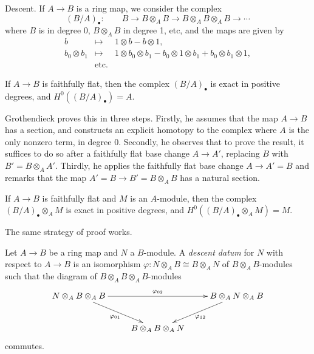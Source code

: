 \medskip\noindent
Descent. If $A \to B$ is a ring map, we consider the complex
$$
(B/A)_\bullet : \qquad B \to B\otimes_A B \to B\otimes_A B \otimes_A B \to
\cdots
$$
where $B$ is in degree 0, $B\otimes_A B$ in degree 1, etc, and the maps are
given by
\begin{eqnarray*}
b & \mapsto & 1 \otimes b - b \otimes 1, \\
b_0 \otimes b_1 & \mapsto & 1 \otimes b_0 \otimes b_1 - b_0 \otimes 1 \otimes
b_1 + b_0 \otimes b_1 \otimes 1, \\
& \text{etc.}
\end{eqnarray*}

\begin{lemma}
\label{lemma-algebra-descent}
If $A \to B$ is faithfully flat, then the complex $(B/A)_\bullet$ is exact in
positive degrees, and $H^0((B/A)_\bullet) = A$.
\end{lemma}

\noindent
Grothendieck proves this in three steps. Firstly, he assumes that the map $A
\to B$ has a section, and constructs an explicit homotopy to the complex where
$A$ is the only nonzero term, in degree 0. Secondly, he observes that to prove
the result, it suffices to do so after a faithfully flat base change $A \to
A'$, replacing $B$ with $B' = B \otimes_A A'$. Thirdly, he applies the
faithfully flat base change $A \to A' =B$ and remarks that the map $A' = B \to
B' = B\otimes_A B$ has a natural section.

\begin{lemma}
\label{lemma-descent-modules}
If $A \to B$ is faithfully flat and $M$ is an $A$-module, then the
complex $(B/A)_\bullet \otimes_A M$ is exact in positive degrees, and
$H^0((B/A)_\bullet \otimes_A M) = M$.
\end{lemma}

\noindent
The same strategy of proof works.

\begin{definition}
\label{definition-descent-datum-modules}
Let $A \to B$ be a ring map and $N$ a $B$-module. A {\it descent datum} for
$N$ with respect to $A \to B$ is an isomorphism $\varphi: N\otimes_A B \cong
B\otimes_A N$ of $B\otimes_A B$-modules such that the diagram of $B\otimes_A B
\otimes_A B$-modules
$$
\xymatrix{
{N \otimes_A B \otimes_A B} \ar_{\varphi_{01}}[dr] \ar^{\varphi_{02}}[rr] & &
{B \otimes_A N \otimes_A B}\ar^{\varphi_{12}}[dl] \\
& {B \otimes_A B \otimes_A N}
}
$$
commutes.
\end{definition}

